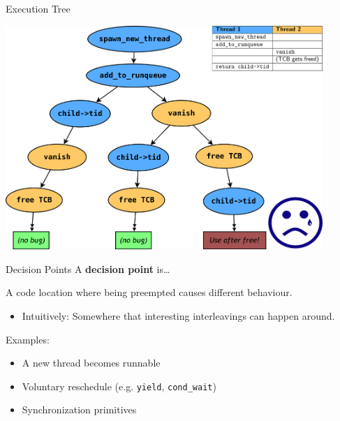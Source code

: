 \documentclass[xcolor=dvipsnames]{beamer}
\begin{document}
\begin{frame}{Execution Tree}
	\begin{center}
		\includegraphics[width=0.9\textwidth]{threadfork2.png}
	\end{center}
\end{frame}

\begin{frame}{Decision Points} %
	A {\bf decision point} is\ldots

	\linegap
	A code location where being preempted causes different behaviour.
	\begin{itemize}
		\item Intuitively: Somewhere that interesting interleavings can happen around.
	\end{itemize}
	Examples:
	\begin{itemize}
		\item A new thread becomes runnable
		\item Voluntary reschedule (e.g. \texttt{yield}, \texttt{cond\_wait})
		\item Synchronization primitives
	\end{itemize}
\end{frame}


\end{document}
